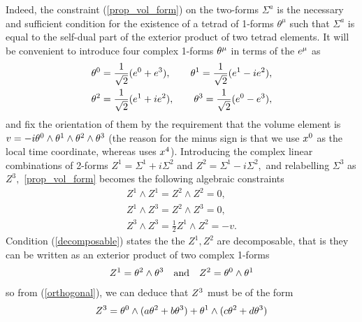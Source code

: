 \documentclass[a4paper,12pt, onecolumn, notitlepage]{article}
\theoremstyle{definition}
\theoremstyle{remark}
\newcommand{\m}{\mu}
\begin{document}
Indeed, the constraint (\ref{prop_vol_form}) on the two-forms $\Sigma^{a}$ is the necessary and sufficient condition for the existence of a tetrad of 1-forms $\theta^{\m}$ such that $\Sigma^{a}$ is equal to the self-dual part of the exterior product of two tetrad elements.
It will be convenient to introduce four complex 1-forms $\theta\indices{^\m}$ in terms of the $e\indices{^\mu}$ as \cite{cahen_1967}
\begin{gather*}
\theta\indices{^0}=\frac{1}{\sqrt{2}}(e\indices{^0}+e\indices{^3}),\qquad\theta\indices{^1}=\frac{1}{\sqrt{2}}(e\indices{^1}-ie\indices{^2}),\\
\theta\indices{^2}=\frac{1}{\sqrt{2}}(e\indices{^1}+ie\indices{^2}),\qquad\theta\indices{^3}=\frac{1}{\sqrt{2}}(e\indices{^0}-e\indices{^3}),
\end{gather*}
and fix the orientation of them by the requirement that the volume element is $v=-i\theta\indices{^0}\wedge\theta\indices{^1}\wedge\theta\indices{^2}\wedge\theta\indices{^3}$ (the reason for the minus sign is that we use $x\indices{^0}$ as the local time coordinate, whereas \cite{cahen_1967} uses $x\indices{^4}$). 
Introducing the complex linear combinations of 2-forms $Z^{1} = \Sigma^{1}+ i\Sigma^{2}$ and $Z^{2} = \Sigma^{1}- i\Sigma^{2},$ and relabelling $\Sigma^{3}$ as $Z^{3},$ \cref{prop_vol_form} becomes the following algebraic constraints
\begin{subequations}
	\begin{gather}
	\label{decomposable}
	Z^{1}\wedge Z^{1}=Z^{2}\wedge Z^{2}=0,\\
	\label{orthogonal}
	Z^{1}\wedge Z^{3}= Z^{2}\wedge Z^{3}=0,\\
	\label{frame}
	Z^{3}\wedge Z^{3}=\frac{1}{2}Z^{1}\wedge Z^{2}=-v.
	\end{gather}
\end{subequations}
Condition (\ref{decomposable}) states the the $Z^{1}, Z^{2}$ are decomposable, that is they can be written as an exterior product of two complex 1-forms
\begin{align*}
	Z\indices{^1}=\theta\indices{^2}\wedge\theta\indices{^3}\quad\text{and}\quad
	Z\indices{^2}=\theta\indices{^0}\wedge\theta\indices{^1}
\end{align*}
so from (\ref{orthogonal}), we can deduce that $Z\indices{^3}$ must be of the form
\begin{equation}
\label{z1z2}
	Z\indices{^3}=\theta\indices{^0}\wedge(a\theta\indices{^2} + b\theta\indices{^3}) + \theta\indices{^1}\wedge(c\theta{^2} + d\theta\indices{^3})
\end{equation}
\end{document}
